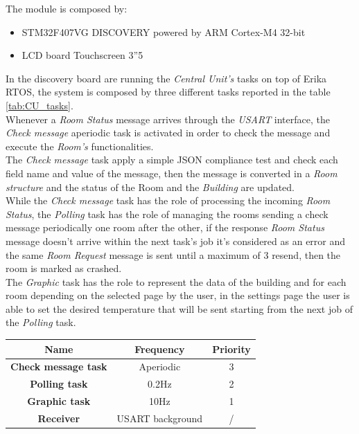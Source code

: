 The module is composed by:
\begin{itemize}
	\item STM32F407VG DISCOVERY powered by ARM Cortex-M4 32-bit
	\item LCD board Touchscreen 3”5
\end{itemize}
In the discovery board are running the \textit{Central Unit's} tasks on top of Erika RTOS, the system is composed by three different tasks reported in the table \ref{tab:CU_tasks}.\\
Whenever a \textit{Room Status} message arrives through the \textit{USART} interface, the \textit{Check message} aperiodic task is activated in order to check the message and execute the \textit{Room's} functionalities.\\
The \textit{Check  message} task apply a simple JSON compliance test and check each field name and value of the message, then the message is converted in a \textit{Room structure} and the status of the Room and the \textit{Building} are updated.\\
While the \textit{Check message} task has the role of processing the incoming \textit{Room Status}, the \textit{Polling} task has the role of managing the rooms sending a check message periodically one room after the other, 
if the response \textit{Room Status} message doesn't arrive within the next task's job it's considered as an error and the same \textit{Room Request} message is sent until a maximum of 3 resend, then the room is marked as crashed.\\
The \textit{Graphic} task has the role to represent the data of the building and for each room depending on the selected page by the user, in the settings page the user is able to set the desired temperature that will be sent starting from the next job of the \textit{Polling} task.\\
\begin{center}
	\begin{tabular}{||c | c | c ||} 
		\hline
		Name 	& Frequency & Priority	\\ 
		\hline
		\textbf{Check message task}	&	Aperiodic		& 3 	\\ 
		\hline
		\textbf{Polling task}		&	0.2Hz			& 2 	\\ 
		\hline
		\textbf{Graphic task}		&	10Hz			& 1 	\\ 
		\hline
		\textbf{Receiver}			&	USART background		& / 	\\ 
		\hline
	\end{tabular}
\end{center}
